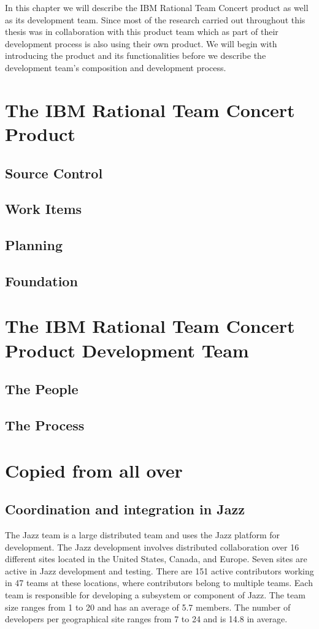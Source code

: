 In this chapter we will describe the IBM Rational Team Concert product as well as its development team.
Since most of the research carried out throughout this thesis was in collaboration with this product team which as part of their development process is also using their own product.
We will begin with introducing the product and its functionalities before we describe the development team's composition and development process.

\section{The IBM Rational Team Concert Product}
\subsection{Source Control}
\subsection{Work Items}
\subsection{Planning}
\subsection{Foundation}

\section{The IBM Rational Team Concert Product Development Team}
\subsection{The People}
\subsection{The Process}



\section{Copied from all over}
\subsection{Coordination and integration in Jazz}
The Jazz team is a large distributed team and uses the Jazz platform for
development. The Jazz development involves distributed collaboration over 16
different sites located in the United States, Canada, and Europe. Seven sites are
active in Jazz development and testing. There are 151 active contributors
working in 47 teams at these locations, where contributors belong to multiple
teams. Each team is responsible for developing a subsystem or component of Jazz.
The team size ranges from 1 to 20 and has an average of 5.7 members. The number
of developers per geographical site ranges from 7 to 24 and is 14.8 in average.

